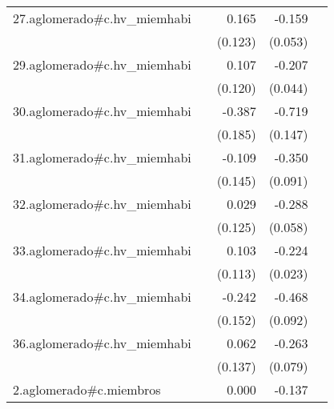 {\begin{longtable}{l*{4}{D{.}{.}{-1}}}
\addlinespace
27.aglomerado#c.hv\_miemhabi&                     &       0.165         &      -0.159\sym{**} &                     \\
            &                     &     (0.123)         &     (0.053)         &                     \\
\addlinespace
29.aglomerado#c.hv\_miemhabi&                     &       0.107         &      -0.207\sym{***}&                     \\
            &                     &     (0.120)         &     (0.044)         &                     \\
\addlinespace
30.aglomerado#c.hv\_miemhabi&                     &      -0.387\sym{*}  &      -0.719\sym{***}&                     \\
            &                     &     (0.185)         &     (0.147)         &                     \\
\addlinespace
31.aglomerado#c.hv\_miemhabi&                     &      -0.109         &      -0.350\sym{***}&                     \\
            &                     &     (0.145)         &     (0.091)         &                     \\
\addlinespace
32.aglomerado#c.hv\_miemhabi&                     &       0.029         &      -0.288\sym{***}&                     \\
            &                     &     (0.125)         &     (0.058)         &                     \\
\addlinespace
33.aglomerado#c.hv\_miemhabi&                     &       0.103         &      -0.224\sym{***}&                     \\
            &                     &     (0.113)         &     (0.023)         &                     \\
\addlinespace
34.aglomerado#c.hv\_miemhabi&                     &      -0.242         &      -0.468\sym{***}&                     \\
            &                     &     (0.152)         &     (0.092)         &                     \\
\addlinespace
36.aglomerado#c.hv\_miemhabi&                     &       0.062         &      -0.263\sym{***}&                     \\
            &                     &     (0.137)         &     (0.079)         &                     \\
\addlinespace
2.aglomerado#c.miembros&                     &       0.000         &      -0.137\sym{***}&                     \\

\end{longtable}}
